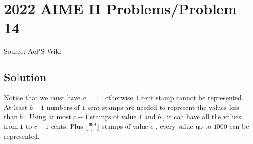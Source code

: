 \documentclass[12pt]{article}
\begin{document}
\section*{{2022 AIME II Problems/Problem 14}}
Source: AoPS Wiki

\subsection*{Solution}
Notice that we must have $a = 1$ ; otherwise $1$ cent stamp cannot be represented. At least $b-1$ numbers of $1$ cent stamps are needed to represent the values less than $b$ . Using at most $c-1$ stamps of value $1$ and $b$ , it can have all the values from $1$ to $c-1$ cents. Plus $\lfloor \frac{999}{c} \rfloor$ stamps of value $c$ , every value up to $1000$ can be represented.
\end{document}
